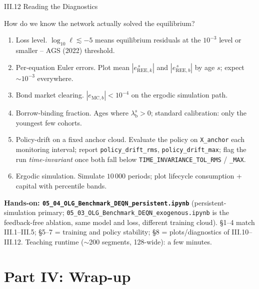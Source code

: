 \documentclass[aspectratio=169,11pt]{beamer}
\newcommand{\emphc}[1]{\textcolor{harvardcrimson}{#1}}
\newcommand{\Loss}{\ell}
\begin{document}
\begin{frame}{III.12 Reading the Diagnostics}
\footnotesize
\begin{block}{How do we know the network actually solved the equilibrium?}
\vspace{-2pt}\begin{enumerate}\itemsep1pt
    \item \emphc{Loss level.}  $\log_{10}\Loss \lesssim -5$ means equilibrium residuals at the $10^{-3}$ level or smaller -- AGS (2022) threshold.
    \item \emphc{Per-equation Euler errors.}  Plot mean $|e_{\text{REE},k}^{\,s}|$ and $|e_{\text{REE},b}^{\,s}|$ by age $s$; expect $\sim 10^{-3}$ everywhere.
    \item \emphc{Bond market clearing.}  $|e_{\text{MC},b}| < 10^{-4}$ on the ergodic simulation path.
    \item \emphc{Borrow-binding fraction.}  Ages where $\lambda_{\text{b}}^s > 0$; standard calibration: only the youngest few cohorts.
    \item \emphc{Policy-drift on a fixed anchor cloud.}  Evaluate the policy on \texttt{X\_anchor} each monitoring interval; report \texttt{policy\_drift\_rms}, \texttt{policy\_drift\_max}; flag the run \emph{time-invariant} once both fall below \texttt{TIME\_INVARIANCE\_TOL\_RMS} / \texttt{\_MAX}.
    \item \emphc{Ergodic simulation.}  Simulate $10\,000$ periods; plot lifecycle consumption + capital with percentile bands.
\end{enumerate}
\end{block}

\vspace{-2pt}
\textbf{Hands-on: \texttt{05\_04\_OLG\_Benchmark\_DEQN\_persistent.ipynb}} (persistent-simulation primary; \texttt{05\_03\_OLG\_Benchmark\_DEQN\_exogenous.ipynb} is the feedback-free ablation, same model and loss, different training cloud).  \S 1--4 match III.1--III.5; \S 5--7 = training and policy stability; \S 8 = plots/diagnostics of III.10--III.12.  Teaching runtime ($\sim$200 segments, 128-wide): a few minutes.
\end{frame}



\section{Part IV: Wrap-up}
\end{document}
